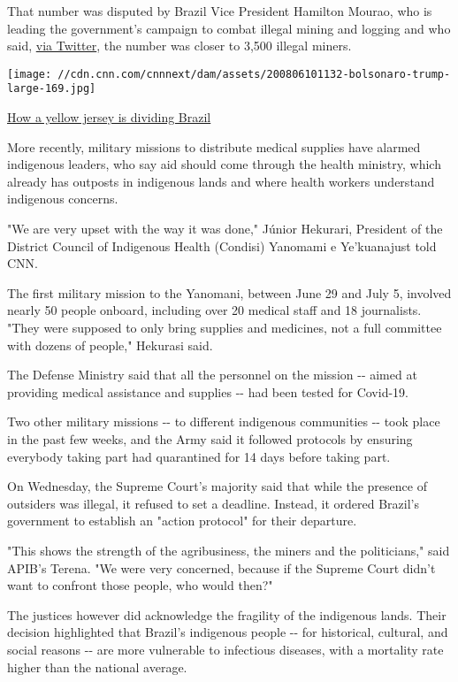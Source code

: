 That number was disputed by Brazil Vice President Hamilton Mourao, who
is leading the government's campaign to combat illegal mining and
logging and who said,
\href{https://twitter.com/generalmourao?lang=en}{via Twitter}, the
number was closer to 3,500 illegal miners.

\href{/2020/08/06/football/bolsonaro-brazil-foootball-yellow-shirt-cmd-spt-intl/index.html}{}

\texttt{[image: //cdn.cnn.com/cnnnext/dam/assets/200806101132-bolsonaro-trump-large-169.jpg]}

\href{/2020/08/06/football/bolsonaro-brazil-foootball-yellow-shirt-cmd-spt-intl/index.html}{How
a yellow jersey is dividing Brazil}

More recently, military missions to distribute medical supplies have
alarmed indigenous leaders, who say aid should come through the health
ministry, which already has outposts in indigenous lands and where
health workers understand indigenous concerns.

"We are very upset with the way it was done," Júnior Hekurari, President
of the District Council of Indigenous Health (Condisi) Yanomami e
Ye'kuanajust told CNN.

The first military mission to the Yanomani, between June 29 and July 5,
involved nearly 50 people onboard, including over 20 medical staff and
18 journalists. "They were supposed to only bring supplies and
medicines, not a full committee with dozens of people," Hekurasi said.

The Defense Ministry said that all the personnel on the mission -\/-
aimed at providing medical assistance and supplies -\/- had been tested
for Covid-19.

Two other military missions -\/- to different indigenous communities
-\/- took place in the past few weeks, and the Army said it followed
protocols by ensuring everybody taking part had quarantined for 14 days
before taking part.

On Wednesday, the Supreme Court's majority said that while the presence
of outsiders was illegal, it refused to set a deadline. Instead, it
ordered Brazil's government to establish an "action protocol" for their
departure.

"This shows the strength of the agribusiness, the miners and the
politicians," said APIB's Terena. "We were very concerned, because if
the Supreme Court didn't want to confront those people, who would then?"

The justices however did acknowledge the fragility of the indigenous
lands. Their decision highlighted that Brazil's indigenous people -\/-
for historical, cultural, and social reasons -\/- are more vulnerable to
infectious diseases, with a mortality rate higher than the national
average.

